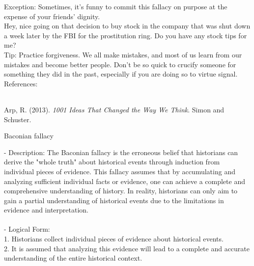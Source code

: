 \documentclass[a4paper,12pt,single,pdftex]{scrartcl}
\begin{document}
{    
      Exception: Sometimes, it’s funny to commit this fallacy on purpose at the expense of your friends’ dignity.
    \\

    
      Hey, nice going on that decision to buy stock in the company that was shut down a week later by the FBI for the prostitution ring.  Do you have any stock tips for me?
    \\

    
      Tip: Practice forgiveness. We all make mistakes, and most of us learn from our mistakes and become better people. Don’t be so quick to crucify someone for something they did in the past, especially if you are doing so to virtue signal.
    \\

    References:

    
      
        
      \\

      
        
          Arp, R. (2013). {\it 1001 Ideas That Changed the Way We Think}. Simon and Schuster.
        
      
    
  }


Baconian fallacy
    
      - Description: The Baconian fallacy is the erroneous belief that historians can derive the "whole truth" about historical events through induction from individual pieces of evidence. This fallacy assumes that by accumulating and analyzing sufficient individual facts or evidence, one can achieve a complete and comprehensive understanding of history. In reality, historians can only aim to gain a partial understanding of historical events due to the limitations in evidence and interpretation.
    \\

    
      
    \\

    
      - Logical Form:
    \\

    
        1. Historians collect individual pieces of evidence about historical events.
    \\

    
        2. It is assumed that analyzing this evidence will lead to a complete and accurate understanding of the entire historical context.
    \\
\end{document}
